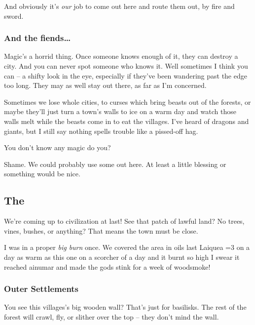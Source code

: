 \begin{multicols}{2}
\begin{exampletext}
  And obviously it's \emph{our} job to come out here and route them out, by fire and sword.


  \subsubsection*{And the fiends\ldots}

  Magic's a horrid thing.
  Once someone knows enough of it, they can destroy a city.
  And you can never spot someone who knows it.
  Well sometimes I think you can -- a shifty look in the eye, especially if they've been wandering past the \gls{edge} too long.
  They may as well stay out there, as far as I'm concerned.

  Sometimes we lose whole cities, to curses which bring beasts out of the forests, or maybe they'll just turn a town's walls to ice on a warm day and watch those walls melt while the beasts come in to eat the \glspl{village}.
  I've heard of dragons and giants, but I still say nothing spells trouble like a pissed-off hag.

  You don't know any magic do you?

  Shame.
  We could probably use some out here.
  At least a little blessing or something would be nice.
\end{exampletext}

\subsection*{The }

\begin{exampletext}
  We're coming up to civilization at last!
  See that patch of lawful land?
  No trees, vines, bushes, or anything?
  That means the town must be close.

  I was in a proper \textit{big burn} once.
  We covered the area in oils last Laiquea \ifnum\value{temperature}=3 on a day as warm as this one \else on a scorcher of a day \fi and it burnt so high I swear it reached \gls{ainumar} and made the gods stink for a week of woodsmoke!

  \subsubsection*{Outer Settlements}

  You see this \glspl{village}'s big wooden wall?
  That's just for basilisks.
  The rest of the forest will crawl, fly, or slither over the top -- they don't mind the wall.


\end{exampletext}
\end{multicols}
